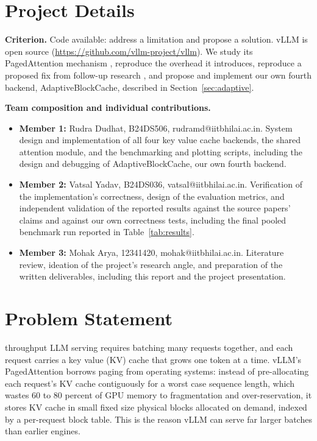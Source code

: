 \documentclass[lettersize,journal]{IEEEtran}
\begin{document}
\vspace{6pt}

\section{Project Details}

\textbf{Criterion.} Code available: address a limitation and propose a solution. vLLM is open source (\url{https://github.com/vllm-project/vllm}). We study its PagedAttention mechanism \cite{kwon2023efficient}, reproduce the overhead it introduces, reproduce a proposed fix from follow-up research \cite{prabhu2024vattention}, and propose and implement our own fourth backend, AdaptiveBlockCache, described in Section~\ref{sec:adaptive}.

\textbf{Team composition and individual contributions.}
\begin{itemize}
    \item \textbf{Member 1:} Rudra Dudhat, B24DS506, rudramd@iitbhilai.ac.in. System design and implementation of all four key value cache backends, the shared attention module, and the benchmarking and plotting scripts, including the design and debugging of AdaptiveBlockCache, our own fourth backend.
    \item \textbf{Member 2:} Vatsal Yadav, B24DS036, vatsal@iitbhilai.ac.in. Verification of the implementation's correctness, design of the evaluation metrics, and independent validation of the reported results against the source papers' claims and against our own correctness tests, including the final pooled benchmark run reported in Table~\ref{tab:results}.
    \item \textbf{Member 3:} Mohak Arya, 12341420, mohak@iitbhilai.ac.in. Literature review, ideation of the project's research angle, and preparation of the written deliverables, including this report and the project presentation.
\end{itemize}

\section{Problem Statement}

 throughput LLM serving requires batching many requests together, and each request carries a key value (KV) cache that grows one token at a time. vLLM's PagedAttention \cite{kwon2023efficient} borrows paging from operating systems: instead of pre-allocating each request's KV cache contiguously for a worst case sequence length, which wastes 60 to 80 percent of GPU memory to fragmentation and over-reservation, it stores KV cache in small fixed size physical blocks allocated on demand, indexed by a per-request block table. This is the reason vLLM can serve far larger batches than earlier engines.
\end{document}
